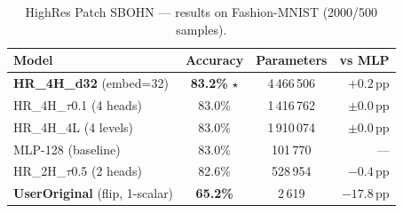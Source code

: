 \begin{table}[h]
\centering
\caption{HighRes Patch SBOHN --- results on Fashion-MNIST (2000/500 samples).}
\begin{tabular}{lccr}
\hline
\textbf{Model} & \textbf{Accuracy} & \textbf{Parameters} & \textbf{vs MLP} \\
\hline
\textbf{HR\_4H\_d32} (embed=32)             & \textbf{83.2\%} $\star$ & 4\,466\,506 & $+0.2$\,pp \\
HR\_4H\_$\tau$0.1 (4 heads)              & 83.0\%                  & 1\,416\,762 & $\pm 0.0$\,pp \\
HR\_4H\_4L (4 levels)                     & 83.0\%                  & 1\,910\,074 & $\pm 0.0$\,pp \\
MLP-128 (baseline)                          & 83.0\%                  & 101\,770   & --- \\
HR\_2H\_$\tau$0.5 (2 heads)              & 82.6\%                  & 528\,954   & $-0.4$\,pp \\
\textbf{UserOriginal} (flip, 1-scalar)      & \textbf{65.2\%}         & 2\,619     & $-17.8$\,pp \\
\hline
\end{tabular}
\end{table}
